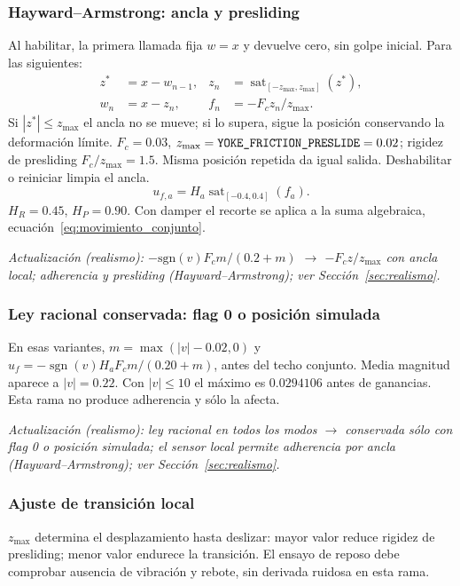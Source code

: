 \documentclass[11pt,a4paper]{article}
\newcommand{\code}[1]{\texttt{\detokenize{#1}}}
\newcommand{\sat}{\operatorname{sat}}
\begin{document}
\subsubsection{Hayward--Armstrong: ancla y presliding}
Al habilitar, la primera llamada fija $w=x$ y devuelve cero, sin golpe inicial. Para las siguientes:
\begin{align}
z^*&=x-w_{n-1},& z_n&=\sat_{[-z_{\max},z_{\max}]}(z^*),\\
w_n&=x-z_n,&f_n&=-F_cz_n/z_{\max}.
\label{eq:friccion_magnitud}
\end{align}
Si $|z^*|\le z_{\max}$ el ancla no se mueve; si lo supera, sigue la posición conservando la deformación límite. $F_c=0.03$, $z_{\max}=\code{YOKE_FRICTION_PRESLIDE}=0.02$; rigidez de presliding $F_c/z_{\max}=1.5$. Misma posición repetida da igual salida. Deshabilitar o reiniciar limpia el ancla.
\begin{equation}\boxed{u_{f,a}=H_a\sat_{[-0.4,0.4]}(f_a)}.\label{eq:friccion_aislada}\end{equation}
$H_R=0.45$, $H_P=0.90$. Con damper el recorte se aplica a la suma algebraica, ecuación~\ref{eq:movimiento_conjunto}.


\textit{Actualización (realismo): $-\mathrm{sgn}(v)F_cm/(0.2+m)$ $\rightarrow$ $-F_cz/z_{\max}$ con ancla local; adherencia y presliding (Hayward--Armstrong); ver Sección~\ref{sec:realismo}.}

\subsubsection{Ley racional conservada: flag 0 o posición simulada}
En esas variantes, $m=\max(|v|-0.02,0)$ y $u_f=-\operatorname{sgn}(v)H_aF_cm/(0.20+m)$, antes del techo conjunto. Media magnitud aparece a $|v|=0.22$. Con $|v|\le10$ el máximo es $0.0294106$ antes de ganancias. Esta rama no produce adherencia y \code{YOKE_FRICTION_SPEED} sólo la afecta.


\textit{Actualización (realismo): ley racional en todos los modos $\rightarrow$ conservada sólo con flag 0 o posición simulada; el sensor local permite adherencia por ancla (Hayward--Armstrong); ver Sección~\ref{sec:realismo}.}

\subsubsection{Ajuste de transición local}
$z_{\max}$ determina el desplazamiento hasta deslizar: mayor valor reduce rigidez de presliding; menor valor endurece la transición. El ensayo de reposo debe comprobar ausencia de vibración y rebote, sin derivada ruidosa en esta rama.
\end{document}
